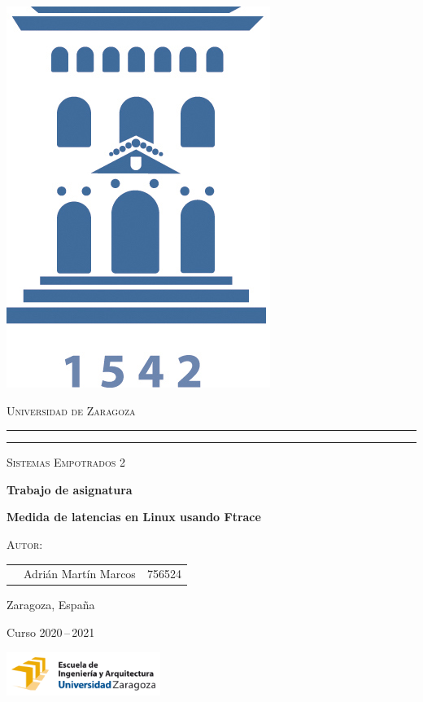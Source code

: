 \documentclass[a4paper,10pt]{article}
\begin{document}
\begin{titlepage}
    \centering
    \includegraphics[width=1 cm]{logoUZ.jpg}
    
    \textsc{\large Universidad de Zaragoza}
    \rule{\textwidth}{1.6pt}\vspace*{-\baselineskip}\vspace*{2pt} %
    \rule{\textwidth}{0.4pt} %
    
    \vfill
    
    {\LARGE \scshape Sistemas Empotrados 2}
                
    \vspace{2cm}            

    {\bfseries \Huge Trabajo de asignatura}
    
    \vspace{.5cm} 
    
    {\bfseries \Large Medida de latencias en Linux usando Ftrace}
    
    \vspace{3cm}    
    
   

    {\scshape Autor:}


    \vspace{0.2cm}
    
    \large
    \begin{tabular}{c l l}
    \large             & Adrián Martín Marcos       & 756524 \\
     \end{tabular}

    \vfill
    
    \large{Zaragoza, España}
    
    {Curso 2020\,--\,2021}

    \vfill

    \includegraphics[width=5.0cm]{EINA.png}
   
\end{titlepage}



\vspace*{2cm}
\end{document}
